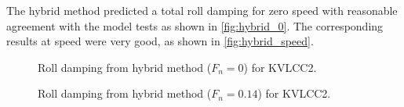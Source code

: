 The hybrid method predicted a total roll damping for zero speed with reasonable agreement with the model tests as shown in \autoref{fig:hybrid_0}. The corresponding results at speed were very good, as shown in \autoref{fig:hybrid_speed}.
\begin{figure}[h]
\caption{Roll damping from hybrid method ($F_n = 0$) for KVLCC2.}
\label{fig:hybrid_0}
\end{figure}
\begin{figure}[h]
\caption{Roll damping from hybrid method ($F_n = 0.14$) for KVLCC2.}
\label{fig:hybrid_speed}
\end{figure}


